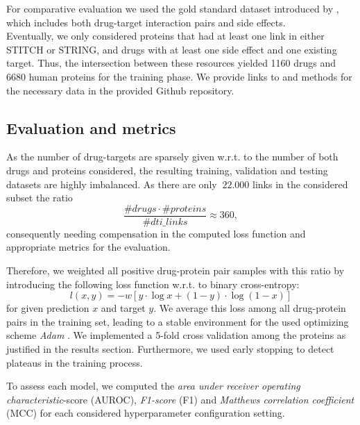 \documentclass{bioinfo}
\begin{document}
For comparative evaluation we used the gold standard dataset introduced by \citet{Yaminishi2008}, which includes both drug-target interaction pairs and side effects.\\ 
 
Eventually, we only considered proteins that had at least one link in either STITCH or STRING, and drugs with at least one side effect and one existing target. Thus, the intersection between these resources yielded 1160 drugs and 6680 human proteins for the training phase. We provide links to and methods for the necessary data in the provided Github repository.\\

\subsection{Evaluation and metrics}

As the number of drug-targets are sparsely given w.r.t. to the number of both drugs and proteins considered, the
resulting training, validation and testing datasets are highly
imbalanced. As there are only $~22.000$ links in
the considered subset the ratio
\begin{equation*}
	\frac{\#drugs \cdot \#proteins}{\#dti\_links} \approx 360,
\end{equation*}
consequently needing compensation in the computed loss function and
appropriate metrics for the evaluation.

Therefore, we weighted all positive drug-protein pair samples with
this ratio by introducing the following loss function w.r.t. to binary cross-entropy:
\begin{equation}
	l(x,y) = - w \left[ y \cdot \log x + (1 - y) \cdot \log (1 - x) \right]
\end{equation}
for given prediction $x$ and target $y$. We average this loss among
all drug-protein pairs in the training set, leading to a stable
environment for the used optimizing scheme \textit{Adam}
\citep{Adam2014}. We implemented a 5-fold cross validation among the
proteins as justified in the results section. Furthermore, we used
early stopping to detect plateaus in the training process.

To assess each model, we computed the \textit{area under receiver
  operating characteristic}-score (AUROC), \textit{F1-score} (F1) and
\textit{Matthews correlation coefficient} (MCC) for each considered
hyperparameter configuration setting.
\end{document}
